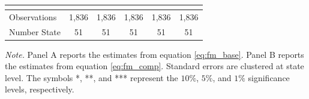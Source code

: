 \documentclass[dv_diss_main.tex]{subfiles}
\begin{document}
\begin{table}[H]
\begin{center}
{\begin{tabular}{lccccc}
    \vspace{4pt} & \begin{footnotesize}\end{footnotesize} & \begin{footnotesize}\end{footnotesize} & \begin{footnotesize}\end{footnotesize} & \begin{footnotesize}\end{footnotesize} & \begin{footnotesize}\end{footnotesize} \\
    \hline
    Observations & 1,836 & 1,836 & 1,836 & 1,836 & 1,836 \\
    Number State & 51 & 51 & 51 & 51 & 51 \\
   \hline

    \end{tabular}
    }
    \label{tab:fm_state}
    \end{center}
        
    \footnotesize{\textit{Note. }Panel A reports the estimates from equation \eqref{eq:fm_base}. Panel B reports the estimates from equation \eqref{eq:fm_comp}. Standard errors are clustered at state level. The symbols *, **, and *** represent the $10\%$, $5\%$, and $1\%$ significance levels, respectively.}
\end{table}
\end{document}
